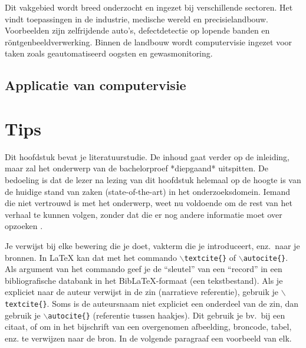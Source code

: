 Dit vakgebied wordt breed onderzocht en ingezet bij verschillende sectoren. Het vindt toepassingen in de industrie, medische wereld en precisielandbouw. Voorbeelden zijn zelfrijdende auto’s, defectdetectie op lopende banden en röntgenbeeldverwerking. Binnen de landbouw wordt computervisie ingezet voor taken zoals geautomatiseerd oogsten en gewasmonitoring.

\subsection{Applicatie van computervisie}















\section{Tips}

Dit hoofdstuk bevat je literatuurstudie. De inhoud gaat verder op de inleiding, maar zal het onderwerp van de bachelorproef *diepgaand* uitspitten. De bedoeling is dat de lezer na lezing van dit hoofdstuk helemaal op de hoogte is van de huidige stand van zaken (state-of-the-art) in het onderzoeksdomein. Iemand die niet vertrouwd is met het onderwerp, weet nu voldoende om de rest van het verhaal te kunnen volgen, zonder dat die er nog andere informatie moet over opzoeken \autocite{Pollefliet2011}.

Je verwijst bij elke bewering die je doet, vakterm die je introduceert, enz.\ naar je bronnen. In \LaTeX{} kan dat met het commando \texttt{$\backslash${textcite\{\}}} of \texttt{$\backslash${autocite\{\}}}. Als argument van het commando geef je de ``sleutel'' van een ``record'' in een bibliografische databank in het Bib\LaTeX{}-formaat (een tekstbestand). Als je expliciet naar de auteur verwijst in de zin (narratieve referentie), gebruik je \texttt{$\backslash${}textcite\{\}}. Soms is de auteursnaam niet expliciet een onderdeel van de zin, dan gebruik je \texttt{$\backslash${}autocite\{\}} (referentie tussen haakjes). Dit gebruik je bv.~bij een citaat, of om in het bijschrift van een overgenomen afbeelding, broncode, tabel, enz. te verwijzen naar de bron. In de volgende paragraaf een voorbeeld van elk.

